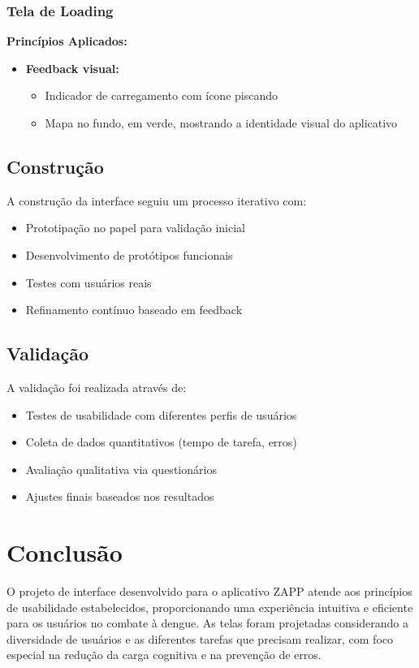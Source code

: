 \documentclass[a4paper, 12pt]{article}
\begin{document}
\subsubsection{Tela de Loading}
\textbf{Princípios Aplicados:}
\begin{itemize}[leftmargin=*]
    \item \textbf{Feedback visual:}
    \begin{itemize}
        \item Indicador de carregamento com ícone piscando
        \item Mapa no fundo, em verde, mostrando a identidade visual do aplicativo
    \end{itemize}
\end{itemize}

\subsection{Construção}
A construção da interface seguiu um processo iterativo com:
\begin{itemize}
\item Prototipação no papel para validação inicial
\item Desenvolvimento de protótipos funcionais
\item Testes com usuários reais
\item Refinamento contínuo baseado em feedback
\end{itemize}

\subsection{Validação}
A validação foi realizada através de:
\begin{itemize}
\item Testes de usabilidade com diferentes perfis de usuários
\item Coleta de dados quantitativos (tempo de tarefa, erros)
\item Avaliação qualitativa via questionários
\item Ajustes finais baseados nos resultados
\end{itemize}

\section{Conclusão}
O projeto de interface desenvolvido para o aplicativo ZAPP atende aos princípios de usabilidade estabelecidos, proporcionando uma experiência intuitiva e eficiente para os usuários no combate à dengue. As telas foram projetadas considerando a diversidade de usuários e as diferentes tarefas que precisam realizar, com foco especial na redução da carga cognitiva e na prevenção de erros.
\end{document}
